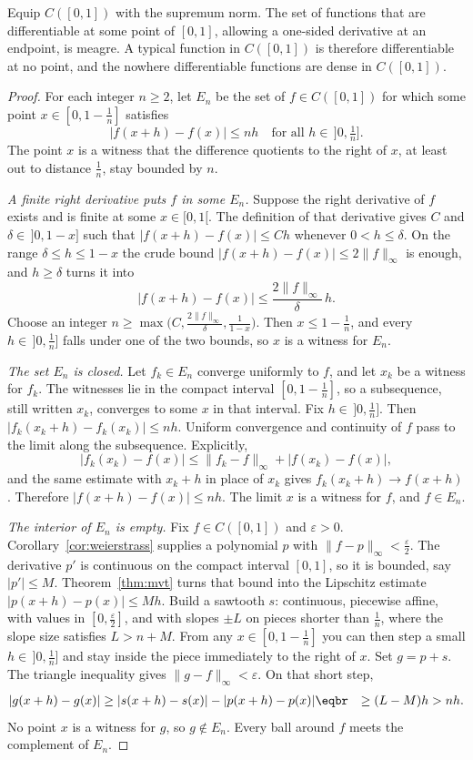 \begin{theorem}\label{thm:banachmaz}
Equip $C([0,1])$ with the supremum norm. The set of functions that are differentiable at some point of $[0,1]$, allowing a one-sided derivative at an endpoint, is meagre. A typical function in $C([0,1])$ is therefore differentiable at no point, and the nowhere differentiable functions are dense in $C([0,1])$.
\end{theorem}
\begin{proof}
For each integer $n\ge2$, let $E_n$ be the set of $f\in C([0,1])$ for which some point $x\in[0,1-\frac1n]$ satisfies
\[|f(x+h)-f(x)|\le nh\quad\text{for all }h\in\,]0,\tfrac1n].\]
The point $x$ is a witness that the difference quotients to the right of $x$, at least out to distance $\frac1n$, stay bounded by $n$.

\emph{A finite right derivative puts $f$ in some $E_n$.} Suppose the right derivative of $f$ exists and is finite at some $x\in[0,1[$. The definition of that derivative gives $C$ and $\delta\in\,]0,1-x]$ such that $|f(x+h)-f(x)|\le Ch$ whenever $0<h\le\delta$. On the range $\delta\le h\le1-x$ the crude bound $|f(x+h)-f(x)|\le2\|f\|_\infty$ is enough, and $h\ge\delta$ turns it into
\[|f(x+h)-f(x)|\le\frac{2\|f\|_\infty}{\delta}\,h.\]
Choose an integer $n\ge\max\bigl(C,\frac{2\|f\|_\infty}{\delta},\frac1{1-x}\bigr)$. Then $x\le1-\frac1n$, and every $h\in\,]0,\frac1n]$ falls under one of the two bounds, so $x$ is a witness for $E_n$.

\emph{The set $E_n$ is closed.} Let $f_k\in E_n$ converge uniformly to $f$, and let $x_k$ be a witness for $f_k$. The witnesses lie in the compact interval $[0,1-\frac1n]$, so a subsequence, still written $x_k$, converges to some $x$ in that interval. Fix $h\in\,]0,\frac1n]$. Then $|f_k(x_k+h)-f_k(x_k)|\le nh$. Uniform convergence and continuity of $f$ pass to the limit along the subsequence. Explicitly,
\[
|f_k(x_k)-f(x)|\le\|f_k-f\|_\infty+|f(x_k)-f(x)|,
\]
and the same estimate with $x_k+h$ in place of $x_k$ gives $f_k(x_k+h)\to f(x+h)$. Therefore $|f(x+h)-f(x)|\le nh$. The limit $x$ is a witness for $f$, and $f\in E_n$.

\emph{The interior of $E_n$ is empty.} Fix $f\in C([0,1])$ and $\varepsilon>0$. Corollary~\ref{cor:weierstrass} supplies a polynomial $p$ with $\|f-p\|_\infty<\frac\varepsilon2$. The derivative $p'$ is continuous on the compact interval $[0,1]$, so it is bounded, say $|p'|\le M$. Theorem~\ref{thm:mvt} turns that bound into the Lipschitz estimate $|p(x+h)-p(x)|\le Mh$. Build a sawtooth $s$: continuous, piecewise affine, with values in $[0,\frac\varepsilon2]$, and with slopes $\pm L$ on pieces shorter than $\frac1n$, where the slope size satisfies $L>n+M$. From any $x\in[0,1-\frac1n]$ you can then step a small $h\in\,]0,\frac1n]$ and stay inside the piece immediately to the right of $x$. Set $g=p+s$. The triangle inequality gives $\|g-f\|_\infty<\varepsilon$. On that short step,
\[
\begin{aligned}
|g(x+h)-g(x)|&\ge|s(x+h)-s(x)|-|p(x+h)-p(x)|\eqbr
&\ge(L-M)h>nh.
\end{aligned}
\]
No point $x$ is a witness for $g$, so $g\notin E_n$. Every ball around $f$ meets the complement of $E_n$.


\end{proof}
